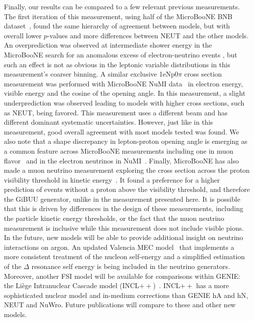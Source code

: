 \documentclass[amsmath,amssymb,aps,prd,showpacs,twocolumn,superscriptaddress,letterpaper,longbibliography, floatfix]{revtex4-2}
\begin{document}
Finally, our results can be compared to a few relevant previous measurements. The first iteration of this measurement, using half of the MicroBooNE BNB dataset~\cite{MicroBooNEXsec}, found the same hierarchy of agreement between models, but with overall lower $p$-values and more differences between NEUT and the other models. An overprediction was observed at intermediate shower energy in the MicroBooNE search for an anomalous excess of electron-neutrino events \cite{PELEEnew}, but such an effect is not as obvious in the leptonic variable distributions in this measurement's coarser binning. A similar exclusive 1eNp0$\pi$ cross section measurement was performed with MicroBooNE NuMI data~\cite{nueCCNuMI} in electron energy, visible energy and the cosine of the opening angle.  In this measurement, a slight underprediction was observed leading to models with higher cross sections, such as NEUT, being favored.  This measurement uses a different beam and has different dominant systematic uncertainties. However, just like in this measurement, good overall agreement with most models tested was found. We also note that a shape discrepancy in lepton-proton opening angle is emerging as a common feature across MicroBooNE measurements including one in muon flavor~\cite{Stevenpaper} and in the electron neutrinos in NuMI~\cite{nueCCNuMI}. Finally, MicroBooNE has also made a muon neutrino measurement exploring the cross section across the proton visibility threshold in kinetic energy~\cite{BensAna}. It found a preference for a higher prediction of events without a proton above the visibility threshold, and therefore the GiBUU generator, unlike in the measurement presented here.  It is possible that this is driven by differences in the design of these measurements, including the particle kinetic energy thresholds, or the fact that the muon neutrino measurement is inclusive while this measurement does not include visible pions.  
\\

In the future, new models will be able to provide additional insight on neutrino interactions on argon. An updated Valencia MEC model~\cite{MECValenciaUpdate} that implements a more consistent treatment of the nucleon self-energy and a simplified estimation of the $\Delta$ resonance self energy is being included in the neutrino generators. 
Moreover, another FSI model will be available for comparisons within GENIE: the Li\`ege Intranuclear Cascade model (INCL$++$)~\cite{INCL,INCL++}. INCL$++$ has a more sophisticated nuclear model and in-medium corrections than GENIE hA and hN, NEUT and NuWro. 
Future publications will compare to these and other new models.
\end{document}
